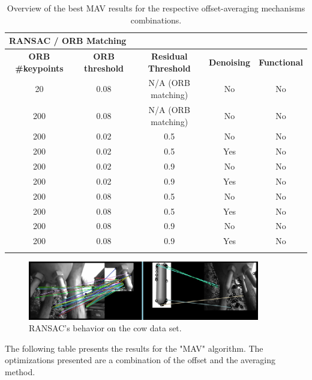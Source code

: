 \begin{longtable}{|c|c|c|c||c|}                            \hline
\multicolumn{5}{|l|}{\textbf{RANSAC / ORB Matching}}              \\\hline
\textbf{ORB \#keypoints} & \textbf{ORB threshold} & \textbf{Residual Threshold} & \textbf{Denoising}       & \textbf{Functional}      \\ \hline
        20      & 0.08      & N/A (ORB matching)       & No     &  No               \\ \hline
        200     & 0.08      & N/A (ORB matching)       & No     &  No               \\ \hline
        200     & 0.02      & 0.5       & No     &  No               \\ \hline
        200     & 0.02      & 0.5       & Yes    &  No               \\ \hline
        200     & 0.02      & 0.9       & No     &  No               \\ \hline
        200     & 0.02      & 0.9       & Yes    &  No               \\ \hline
        200     & 0.08      & 0.5       & No     &  No               \\ \hline
        200     & 0.08      & 0.5       & Yes    &  No               \\ \hline
        200     & 0.08      & 0.9       & No     &  No               \\ \hline
        200     & 0.08      & 0.9       & Yes    &  No               \\ \hline
\caption{Overview of the best MAV results for the respective offset-averaging mechanisms combinations.} \label{tab:ransac-results}                          
\end{longtable}

 \begin{figure}[h]
        \centering
        \includegraphics[width=0.9\textwidth]{images/cow_ransac.png}
        \caption{RANSAC's behavior on the cow data set.}
        \label{fig:ransac-results}
    \end{figure}
    
The following table 
presents the results for the "MAV" algorithm. The optimizations presented are a combination of the offset and the averaging method.

